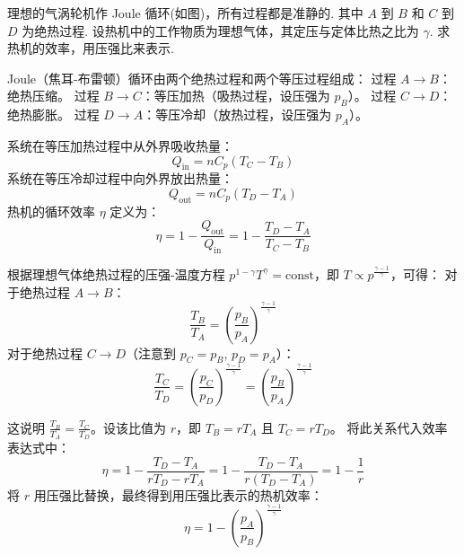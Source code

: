 \begin{exercise}\label{ex:11.9}
理想的气涡轮机作 Joule 循环(如图)，所有过程都是准静的. 其中 $A$ 到 $B$ 和 $C$ 到 $D$ 为绝热过程. 设热机中的工作物质为理想气体，其定压与定体比热之比为 $\gamma$. 求热机的效率，用压强比来表示.
\begin{center}
\end{center}
\end{exercise}
\begin{solution}
Joule（焦耳-布雷顿）循环由两个绝热过程和两个等压过程组成：
过程 $A \to B$：绝热压缩。
过程 $B \to C$：等压加热（吸热过程，设压强为 $p_B$）。
过程 $C \to D$：绝热膨胀。
过程 $D \to A$：等压冷却（放热过程，设压强为 $p_A$）。

系统在等压加热过程中从外界吸收热量：
$$ Q_{\text{in}} = n C_p (T_C - T_B) $$
系统在等压冷却过程中向外界放出热量：
$$ Q_{\text{out}} = n C_p (T_D - T_A) $$
热机的循环效率 $\eta$ 定义为：
$$ \eta = 1 - \frac{Q_{\text{out}}}{Q_{\text{in}}} = 1 - \frac{T_D - T_A}{T_C - T_B} $$

根据理想气体绝热过程的压强-温度方程 $p^{1-\gamma} T^\gamma = \mathrm{const}$，即 $T \propto p^{\frac{\gamma-1}{\gamma}}$，可得：
对于绝热过程 $A \to B$：
$$ \frac{T_B}{T_A} = \left( \frac{p_B}{p_A} \right)^{\frac{\gamma-1}{\gamma}} $$
对于绝热过程 $C \to D$（注意到 $p_C = p_B$, $p_D = p_A$）：
$$ \frac{T_C}{T_D} = \left( \frac{p_C}{p_D} \right)^{\frac{\gamma-1}{\gamma}} = \left( \frac{p_B}{p_A} \right)^{\frac{\gamma-1}{\gamma}} $$

这说明 $\frac{T_B}{T_A} = \frac{T_C}{T_D}$。设该比值为 $r$，即 $T_B = r T_A$ 且 $T_C = r T_D$。
将此关系代入效率表达式中：
$$ \eta = 1 - \frac{T_D - T_A}{r T_D - r T_A} = 1 - \frac{T_D - T_A}{r(T_D - T_A)} = 1 - \frac{1}{r} $$
将 $r$ 用压强比替换，最终得到用压强比表示的热机效率：
$$ \eta = 1 - \left( \frac{p_A}{p_B} \right)^{\frac{\gamma - 1}{\gamma}} $$
\end{solution}

